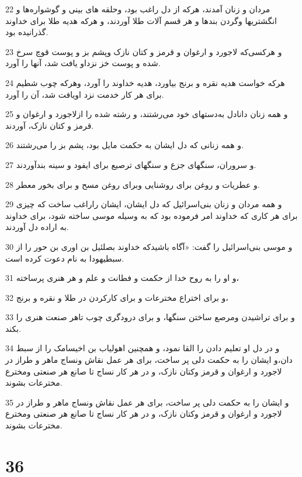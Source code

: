 \par 22 مردان و زنان آمدند، هر‌که از دل راغب بود، وحلقه های بینی و گوشواره‌ها و انگشتریها وگردن بندها و هر قسم آلات طلا آوردند، و هر‌که هدیه طلا برای خداوند گذرانیده بود.
\par 23 و هرکسی‌که لاجورد و ارغوان و قرمز و کتان نازک وپشم بز و پوست قوچ سرخ شده و پوست خز نزداو یافت شد، آنها را آورد.
\par 24 هر‌که خواست هدیه نقره و برنج بیاورد، هدیه خداوند را آورد، وهر‌که چوب شطیم برای هر کار خدمت نزد اویافت شد، آن را آورد.
\par 25 و همه زنان دانادل به‌دستهای خود می‌رشتند، و رشته شده را ازلاجورد و ارغوان و قرمز و کتان نازک، آوردند.
\par 26 و همه زنانی که دل ایشان به حکمت مایل بود، پشم بز را می‌رشتند.
\par 27 و سروران، سنگهای جزع و سنگهای ترصیع برای ایفود و سینه بندآوردند.
\par 28 و عطریات و روغن برای روشنایی وبرای روغن مسح و برای بخور معطر.
\par 29 و همه مردان و زنان بنی‌اسرائیل که دل ایشان، ایشان راراغب ساخت که چیزی برای هر کاری که خداوند امر فرموده بود که به وسیله موسی ساخته شود، برای خداوند به اراده دل آوردند.
\par 30 و موسی بنی‌اسرائیل را گفت: «آگاه باشیدکه خداوند بصلئیل بن اوری بن حور را از سبطیهودا به نام دعوت کرده است.
\par 31 و او را به روح خدا از حکمت و فطانت و علم و هر هنری پرساخته،
\par 32 و برای اختراع مخترعات و برای کارکردن در طلا و نقره و برنج،
\par 33 و برای تراشیدن ومرصع ساختن سنگها، و برای درودگری چوب تاهر صنعت هنری را بکند.
\par 34 و در دل او تعلیم دادن را القا نمود، و همچنین اهولیاب بن اخیسامک را از سبط دان،و ایشان را به حکمت دلی پر ساخت، برای هر عمل نقاش ونساج ماهر و طراز در لاجورد و ارغوان و قرمز وکتان نازک، و در هر کار نساج تا صانع هر صنعتی ومخترع مخترعات بشوند.
\par 35 و ایشان را به حکمت دلی پر ساخت، برای هر عمل نقاش ونساج ماهر و طراز در لاجورد و ارغوان و قرمز وکتان نازک، و در هر کار نساج تا صانع هر صنعتی ومخترع مخترعات بشوند.
 
\chapter{36}

